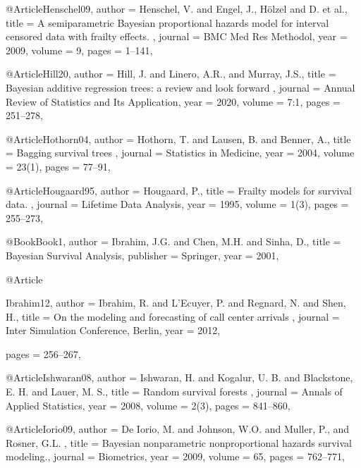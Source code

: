  



@Article{Henschel09,
   author =   {Henschel, V. and Engel, J., Hölzel and D. et al.},
   title =    { A semiparametric Bayesian proportional hazards model for interval censored data with frailty effects.  },
   journal =      {BMC Med Res Methodol},
   year =     {2009},
   volume =   {9},
   pages =    {1--141},
 }

 



@Article{Hill20,
   author =   {Hill, J. and Linero, A.R., and Murray, J.S.},
   title =    { Bayesian additive regression trees: a review and look forward  },
   journal =      {Annual Review of Statistics and Its Application},
   year =     {2020},
   volume =   {7:1},
   pages =    {251--278},
 }
      


@Article{Hothorn04,
   author =   {Hothorn, T. and Lausen, B. and Benner, A.},
   title =    { Bagging survival trees  },
   journal =      {Statistics in Medicine},
   year =     {2004},
   volume =   {23(1)},
   pages =    {77--91},
 }


 


@Article{Hougaard95,
   author =   {Hougaard, P.},
   title =    { Frailty models for survival data. },
   journal =      {Lifetime Data Analysis},
   year =     {1995},
   volume =   {1(3)},
   pages =    {255--273},
 }


@Book{Book1,
   author =   {Ibrahim, J.G. and Chen, M.H. and Sinha, D.},
   title =    {Bayesian Survival Analysis},
   publisher =    {Springer},
   year =     {2001},
}


@Article{Ibrahim12,
   author =   {Ibrahim, R. and L’Ecuyer, P. and Regnard, N. and Shen, H.},
   title =    { On the modeling
and forecasting of call center arrivals  },
   journal =      {Inter Simulation
Conference, Berlin},
   year =     {2012},

   pages =    {256--267},
 }


@Article{Ishwaran08,
   author =   {Ishwaran, H. and Kogalur, U. B. and Blackstone, E. H. and Lauer, M. S.},
   title =    { Random survival forests  },
   journal =      {Annals of Applied Statistics},
   year =     {2008},
   volume =   {2(3)},
   pages =    {841--860},
 }


@Article{Iorio09,
   author =   {De Iorio, M. and Johnson, W.O. and Muller, P., and Rosner, G.L. },
   title =    { Bayesian nonparametric
nonproportional hazards survival modeling.},
   journal =      {Biometrics},
   year =     {2009},
   volume =   {65},
   pages =    {762--771},
 }




